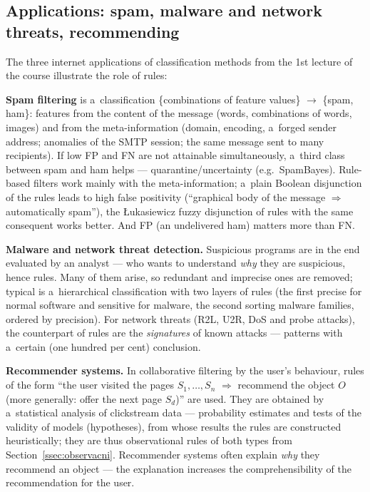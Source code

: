 \documentclass[11pt,a4paper]{article}
\theoremstyle{definition}
\providecommand{\uv}[1]{``#1''}
\begin{document}
\subsection{Applications: spam, malware and network threats, recommending}
\label{ssec:aplikace-pravidel}

The three internet applications of classification methods from the 1st lecture of the
course illustrate the role of rules:

\textbf{Spam filtering} is a~classification \{combinations of feature values\} $\to$
\{spam, ham\}: features from the content of the message (words, combinations of words,
images) and from the meta-information (domain, encoding, a~forged sender address;
anomalies of the SMTP session; the same message sent to many recipients). If low FP and
FN are not attainable simultaneously, a~third class between spam and ham helps ---
quarantine/uncertainty (e.g.\ SpamBayes). Rule-based filters work mainly with the
meta-information; a~plain Boolean disjunction of the rules leads to high false
positivity (\uv{graphical body of the message $\Rightarrow$ automatically spam}), the
Łukasiewicz fuzzy disjunction of rules with the same consequent works better. And FP
(an undelivered ham) matters more than FN.

\textbf{Malware and network threat detection.} Suspicious programs are in the end
evaluated by an analyst --- who wants to understand \emph{why} they are suspicious,
hence rules. Many of them arise, so redundant and imprecise ones are removed; typical
is a~hierarchical classification with two layers of rules (the first precise for
normal software and sensitive for malware, the second sorting malware families,
ordered by precision). For network threats (R2L, U2R, DoS and probe attacks), the
counterpart of rules are the \emph{signatures} of known attacks --- patterns with
a~certain (one hundred per cent) conclusion.

\textbf{Recommender systems.} In collaborative filtering by the user's behaviour, rules
of the form \uv{the user visited the pages $S_1,\dots,S_n$ $\Rightarrow$ recommend the
object $O$ (more generally: offer the next page $S_d$)} are used. They are obtained by
a~statistical analysis of clickstream data --- probability estimates and tests of the
validity of models (hypotheses), from whose results the rules are constructed
heuristically; they are thus observational rules of both types from
Section~\ref{ssec:observacni}. Recommender systems often explain \emph{why} they
recommend an object --- the explanation increases the comprehensibility of the
recommendation for the user.
\end{document}
